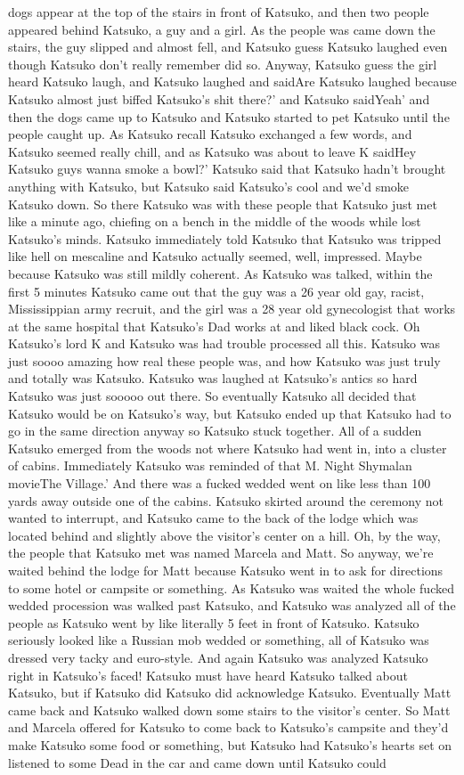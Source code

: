 \documentclass[12pt]{book}
\begin{document}
dogs appear at the top of the stairs in front of Katsuko, and then two people appeared behind Katsuko, a guy and a girl. As the people was came down the stairs, the guy slipped and almost fell, and Katsuko guess Katsuko laughed even though Katsuko don't really remember did so. Anyway, Katsuko guess the girl heard Katsuko laugh, and Katsuko laughed and saidAre Katsuko laughed because Katsuko almost just biffed Katsuko's shit there?' and Katsuko saidYeah' and then the dogs came up to Katsuko and Katsuko started to pet Katsuko until the people caught up. As Katsuko recall Katsuko exchanged a few words, and Katsuko seemed really chill, and as Katsuko was about to leave K saidHey Katsuko guys wanna smoke a bowl?' Katsuko said that Katsuko hadn't brought anything with Katsuko, but Katsuko said Katsuko's cool and we'd smoke Katsuko down. So there Katsuko was with these people that Katsuko just met like a minute ago, chiefing on a bench in the middle of the woods while lost Katsuko's minds. Katsuko immediately told Katsuko that Katsuko was tripped like hell on mescaline and Katsuko actually seemed, well, impressed. Maybe because Katsuko was still mildly coherent. As Katsuko was talked, within the first 5 minutes Katsuko came out that the guy was a 26 year old gay, racist, Mississippian army recruit, and the girl was a 28 year old gynecologist that works at the same hospital that Katsuko's Dad works at and liked black cock. Oh Katsuko's lord K and Katsuko was had trouble processed all this. Katsuko was just soooo amazing how real these people was, and how Katsuko was just truly and totally was Katsuko. Katsuko was laughed at Katsuko's antics so hard Katsuko was just sooooo out there. So eventually Katsuko all decided that Katsuko would be on Katsuko's way, but Katsuko ended up that Katsuko had to go in the same direction anyway so Katsuko stuck together. All of a sudden Katsuko emerged from the woods not where Katsuko had went in, into a cluster of cabins. Immediately Katsuko was reminded of that M. Night Shymalan movieThe Village.' And there was a fucked wedded went on like less than 100 yards away outside one of the cabins. Katsuko skirted around the ceremony not wanted to interrupt, and Katsuko came to the back of the lodge which was located behind and slightly above the visitor's center on a hill. Oh, by the way, the people that Katsuko met was named Marcela and Matt. So anyway, we're waited behind the lodge for Matt because Katsuko went in to ask for directions to some hotel or campsite or something. As Katsuko was waited the whole fucked wedded procession was walked past Katsuko, and Katsuko was analyzed all of the people as Katsuko went by like literally 5 feet in front of Katsuko. Katsuko seriously looked like a Russian mob wedded or something, all of Katsuko was dressed very tacky and euro-style. And again Katsuko was analyzed Katsuko right in Katsuko's faced! Katsuko must have heard Katsuko talked about Katsuko, but if Katsuko did Katsuko did acknowledge Katsuko. Eventually Matt came back and Katsuko walked down some stairs to the visitor's center. So Matt and Marcela offered for Katsuko to come back to Katsuko's campsite and they'd make Katsuko some food or something, but Katsuko had Katsuko's hearts set on listened to some Dead in the car and came down until Katsuko could 
\end{document}
